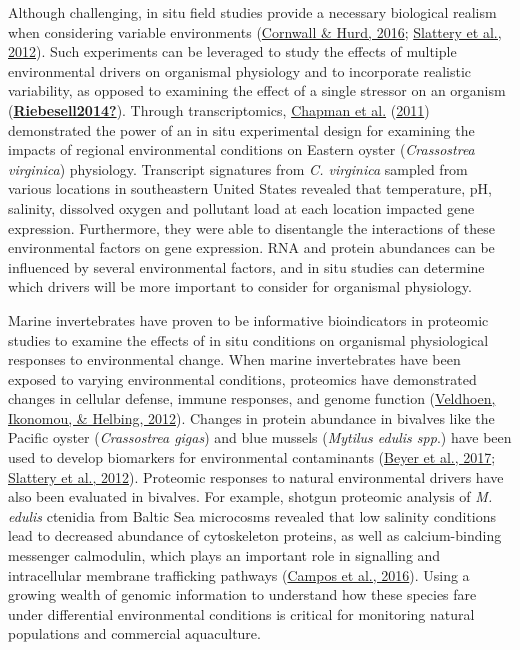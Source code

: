 \documentclass [11pt, proquest] {uwthesis}[2015/03/03]
\begin{document}
Although challenging, in situ field studies provide a necessary biological realism when considering variable environments (\protect\hyperlink{ref-Cornwall2016}{Cornwall \& Hurd, 2016}; \protect\hyperlink{ref-Slattery2012}{Slattery et al., 2012}). Such experiments can be leveraged to study the effects of multiple environmental drivers on organismal physiology and to incorporate realistic variability, as opposed to examining the effect of a single stressor on an organism (\protect\hyperlink{ref-Riebesell2014}{\textbf{Riebesell2014?}}). Through transcriptomics, \protect\hyperlink{ref-Chapman2011}{Chapman et al.} (\protect\hyperlink{ref-Chapman2011}{2011}) demonstrated the power of an in situ experimental design for examining the impacts of regional environmental conditions on Eastern oyster (\emph{Crassostrea virginica}) physiology. Transcript signatures from \emph{C. virginica} sampled from various locations in southeastern United States revealed that temperature, pH, salinity, dissolved oxygen and pollutant load at each location impacted gene expression. Furthermore, they were able to disentangle the interactions of these environmental factors on gene expression. RNA and protein abundances can be influenced by several environmental factors, and in situ studies can determine which drivers will be more important to consider for organismal physiology.

Marine invertebrates have proven to be informative bioindicators in proteomic studies to examine the effects of in situ conditions on organismal physiological responses to environmental change. When marine invertebrates have been exposed to varying environmental conditions, proteomics have demonstrated changes in cellular defense, immune responses, and genome function (\protect\hyperlink{ref-Veldhoen2012}{Veldhoen, Ikonomou, \& Helbing, 2012}). Changes in protein abundance in bivalves like the Pacific oyster (\emph{Crassostrea gigas}) and blue mussels (\emph{Mytilus edulis spp}.) have been used to develop biomarkers for environmental contaminants (\protect\hyperlink{ref-Beyer2017}{Beyer et al., 2017}; \protect\hyperlink{ref-Slattery2012}{Slattery et al., 2012}). Proteomic responses to natural environmental drivers have also been evaluated in bivalves. For example, shotgun proteomic analysis of \emph{M. edulis} ctenidia from Baltic Sea microcosms revealed that low salinity conditions lead to decreased abundance of cytoskeleton proteins, as well as calcium-binding messenger calmodulin, which plays an important role in signalling and intracellular membrane trafficking pathways (\protect\hyperlink{ref-Campos2016}{Campos et al., 2016}). Using a growing wealth of genomic information to understand how these species fare under differential environmental conditions is critical for monitoring natural populations and commercial aquaculture.
\end{document}
